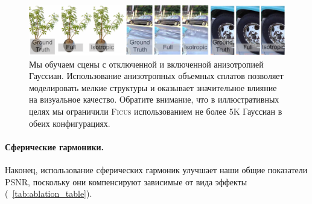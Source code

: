 \begin{figure}[!h]
    \includegraphics{figures/ablations/isotropy_vs_anisotropy2.pdf}
    \caption{
        \label{fig:ablation-aniso}
        Мы обучаем сцены с отключенной и включенной анизотропией Гауссиан. Использование анизотропных объемных сплатов позволяет моделировать мелкие структуры и оказывает значительное влияние на визуальное качество. Обратите внимание, что в иллюстративных целях мы ограничили \textsc{Ficus} использованием не более 5K Гауссиан в обеих конфигурациях.
    }
\end{figure}

\paragraph{Сферические гармоники.}
Наконец, использование сферических гармоник улучшает наши общие показатели PSNR, поскольку они компенсируют зависимые от вида эффекты (~\ref{tab:ablation_table}).

